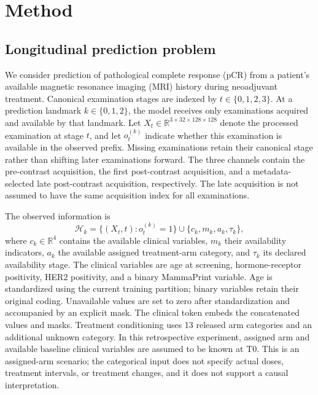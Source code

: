 \section{Method}
\label{sec:method}


\subsection{Longitudinal prediction problem}
\label{sec:problem}
We consider prediction of pathological complete response (pCR) from a patient's available magnetic resonance imaging (MRI) history during neoadjuvant treatment. Canonical examination stages are indexed by $t\in\{0,1,2,3\}$. At a prediction landmark $k\in\{0,1,2\}$, the model receives only examinations acquired and available by that landmark. Let $X_t\in\mathbb{R}^{3\times32\times128\times128}$ denote the processed examination at stage $t$, and let $o_t^{(k)}$ indicate whether this examination is available in the observed prefix. Missing examinations retain their canonical stage rather than shifting later examinations forward. The three channels contain the pre-contrast acquisition, the first post-contrast acquisition, and a metadata-selected late post-contrast acquisition, respectively. The late acquisition is not assumed to have the same acquisition index for all examinations.

The observed information is
\begin{equation}
 \mathcal{H}_k=\bigl\{(X_t,t):o_t^{(k)}=1\bigr\}\cup
 \bigl\{c_k,m_k,a_k,\tau_k\bigr\},
\end{equation}
where $c_k\in\mathbb{R}^{4}$ contains the available clinical variables, $m_k$ their availability indicators, $a_k$ the available assigned treatment-arm category, and $\tau_k$ its declared availability stage. The clinical variables are age at screening, hormone-receptor positivity, HER2 positivity, and a binary MammaPrint variable. Age is standardized using the current training partition; binary variables retain their original coding. Unavailable values are set to zero after standardization and accompanied by an explicit mask. The clinical token embeds the concatenated values and masks. Treatment conditioning uses 13 released arm categories and an additional unknown category. In this retrospective experiment, assigned arm and available baseline clinical variables are assumed to be known at T0. This is an assigned-arm scenario; the categorical input does not specify actual doses, treatment intervals, or treatment changes, and it does not support a causal interpretation.

